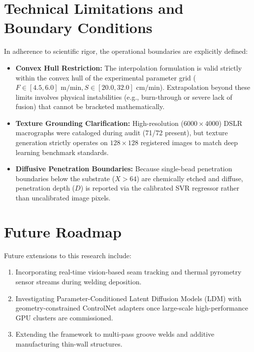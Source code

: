 \documentclass[12pt,a4paper,oneside]{report}
\begin{document}
\section{Technical Limitations and Boundary Conditions}
In adherence to scientific rigor, the operational boundaries are explicitly defined:
\begin{itemize}
    \item \textbf{Convex Hull Restriction:} The interpolation formulation is valid strictly within the convex hull of the experimental parameter grid ($F \in [4.5, 6.0]\text{ m/min}, S \in [20.0, 32.0]\text{ cm/min}$). Extrapolation beyond these limits involves physical instabilities (e.g., burn-through or severe lack of fusion) that cannot be bracketed mathematically.
    \item \textbf{Texture Grounding Clarification:} High-resolution ($6000 \times 4000$) DSLR macrographs were cataloged during audit (71/72 present), but texture generation strictly operates on $128 \times 128$ registered images to match deep learning benchmark standards.
    \item \textbf{Diffusive Penetration Boundaries:} Because single-bead penetration boundaries below the substrate ($X > 64$) are chemically etched and diffuse, penetration depth ($D$) is reported via the calibrated SVR regressor rather than uncalibrated image pixels.
\end{itemize}

\section{Future Roadmap}
Future extensions to this research include:
\begin{enumerate}
    \item Incorporating real-time vision-based seam tracking and thermal pyrometry sensor streams during welding deposition.
    \item Investigating Parameter-Conditioned Latent Diffusion Models (LDM) with geometry-constrained ControlNet adapters once large-scale high-performance GPU clusters are commissioned.
    \item Extending the framework to multi-pass groove welds and additive manufacturing thin-wall structures.
\end{enumerate}
\end{document}
